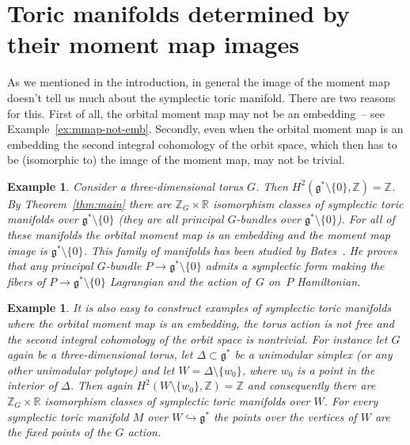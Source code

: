 \documentclass[pdftex]{sigma}
\numberwithin{equation}{section}
\newtheorem{Example}[Lemma]{Example}
\begin{document}
\section{Toric manifolds determined by their moment map images}
\label{sec:the_rest}

As we mentioned in the introduction, in general the image of the
moment map doesn't tell us much about the symplectic toric manifold.
There are two reasons for this. First of all, the orbital moment map
may not be an embedding~-- see Example~\ref{ex:mmap-not-emb}.
Secondly, even when the orbital moment map is an embedding the second
integral cohomology of the orbit space, which then has to be
(isomorphic to) the image of the moment map, may not be trivial.

\begin{Example} Consider a three-dimensional torus $G$.  Then $H^2({\mathfrak g}^*
\setminus \{0\}, {\mathbb Z}) = {\mathbb Z}$.  By Theorem~\ref{thm:main}
there are ${\mathbb Z}_G \times {\mathbb R}$ isomorphism classes of symplectic toric
manifolds over ${\mathfrak g}^* \setminus \{0\}$ (they are all principal
$G$-bundles over ${\mathfrak g}^* \setminus \{0\}$).  For all of these manifolds
the orbital moment map is an embedding and the moment map image is
${\mathfrak g}^*\setminus \{0\}$. This family of manifolds has been studied by
Bates~\cite{Bates}.  He proves that any principal $G$-bundle
$P\to {\mathfrak g}^* \setminus \{0\}$ admits a symplectic form making the f\/ibers of
$P\to {\mathfrak g}^* \setminus \{0\}$ Lagrangian and the action of~$G$ on~$P$ Hamiltonian.
\end{Example}

\begin{Example}
  It is also easy to construct examples of symplectic
  toric manifolds where the orbital moment map is an embedding, the
  torus action is not free and the second integral cohomology of the
  orbit space is nontrivial.  For instance let $G$ again be a three-dimensional torus, let $\Delta \subset {\mathfrak g}^*$ be a unimodular
  simplex (or any other unimodular polytope) and let $W = \Delta
  \setminus \{w_0\}$, where $w_0$ is a point in the interior of
  $\Delta$.  Then again $H^2(W \setminus \{ w_0 \}, {\mathbb Z}) = {\mathbb Z}$ and
  consequently there are ${\mathbb Z}_G \times {\mathbb R}$ isomorphism classes of
  symplectic toric manifolds over $W$.  For every symplectic toric
  manifold $M$ over $W\hookrightarrow {\mathfrak g}^*$ the points over the
  vertices of $W$ are the f\/ixed points of the $G$ action.
\end{Example}
\end{document}

